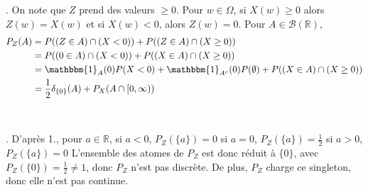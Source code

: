 \documentclass{report}
\begin{document}
\subsection{} \noindent{}\\ 
\\ 
\\
. On note que $Z$ prend des valeurs $\geq 0$. Pour $w\in \Omega$, si $X(w)\geq 0$ alors $Z(w)=X(w)$ et si $X(w)< 0$, alors $Z(w)=0$. Pour $A\in \mathcal B(\mathbb R)$, $$ \begin{aligned}P_Z(A)&=P((Z\in A) \cap (X<0)) + P((Z\in A) \cap (X\geq 0)) \\
&=P((0\in A) \cap (X<0)) + P((X\in A) \cap (X\geq 0)) \\
&= \mathbbm{1}_{A}(0) P(X<0) + \mathbbm{1}_{A^c}(0) P(\emptyset) +  P( (X\in A) \cap (X\geq 0))\\
&=  \frac 12 \delta_{\{0\}}(A) + P_X(A\cap [0,\infty)) \end{aligned}$$ \\ \\
. D'après 1., pour $a\in \mathbb R$, \newline
si $a<0$, $P_Z(\{a\})=0$ \newline
si $a=0$, $P_Z(\{a\})=\frac 12$ \newline
si $a>0$, $P_Z(\{a\})=0$ \newline 
L'ensemble des atomes de $P_Z$ est donc réduit à $\{0\}$, avec $P_Z(\{0\})=\frac 12\neq 1$, donc $P_Z$ n'est pas discrète. De plus, $P_Z$ charge ce singleton, donc elle n'est pas continue.

\newpage
\end{document}
